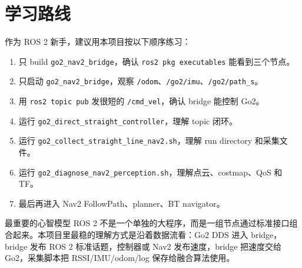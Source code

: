 \documentclass[UTF8,11pt,a4paper,openany]{ctexrep}
\newcommand{\code}[1]{\nolinkurl{#1}}
\newcommand{\file}[1]{\nolinkurl{#1}}
\newcommand{\pkg}[1]{\nolinkurl{#1}}
\newcommand{\topic}[1]{\nolinkurl{#1}}
\newcommand{\rosnode}[1]{\nolinkurl{#1}}
\begin{document}
\chapter{学习路线}

作为 ROS 2 新手，建议用本项目按以下顺序练习：

\begin{enumerate}
  \item 只 build \pkg{go2_nav2_bridge}，确认 \code{ros2 pkg executables} 能看到三个节点。
  \item 只启动 \rosnode{go2_nav2_bridge}，观察 \topic{/odom}、\topic{/go2/imu}、\topic{/go2/path_s}。
  \item 用 \code{ros2 topic pub} 发很短的 \topic{/cmd_vel}，确认 bridge 能控制 Go2。
  \item 运行 \rosnode{go2_direct_straight_controller}，理解 topic 闭环。
  \item 运行 \file{go2_collect_straight_line_nav2.sh}，理解 run directory 和采集文件。
  \item 运行 \file{go2_diagnose_nav2_perception.sh}，理解点云、costmap、QoS 和 TF。
  \item 最后再进入 Nav2 FollowPath、planner、BT navigator。
\end{enumerate}

\begin{notebox}{最重要的心智模型}
ROS 2 不是一个单独的大程序，而是一组节点通过标准接口组合起来。本项目里最稳的理解方式是沿着数据流看：Go2 DDS 进入 bridge，bridge 发布 ROS 2 标准话题，控制器或 Nav2 发布速度，bridge 把速度交给 Go2，采集脚本把 RSSI/IMU/odom/log 保存给融合算法使用。
\end{notebox}
\end{document}
